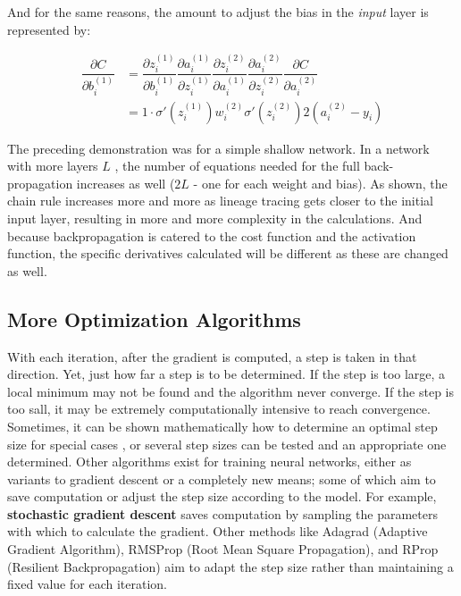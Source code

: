 And for the same reasons, the amount to adjust the bias in the \emph{input} layer is
represented by:

    \begin{align*}
\dfrac{\partial{C}}{\partial{b_i^{(1)}}} 
& = \dfrac{\partial{z_i^{(1)}}}{\partial{b_i^{(1)}}} \dfrac{\partial{a_i^{(1)}}}{\partial{z_i^{(1)}}}  \dfrac{\partial{z_i^{(2)}}}{\partial{a_i^{(1)}}}
     \dfrac{\partial{a_i^{(2)}}}{\partial{z_i^{(2)}}}
     \dfrac{\partial{C}}{\partial{a_i^{(2)}}} \\ \nonumber
& = 1 \cdot \sigma'(z_i^{(1)}) w_i^{(2)} \sigma'(z_i^{(2)}) 2(a_i^{(2)}-y_i) \nonumber
    \end{align*}


The preceding demonstration was for a simple shallow network.  In a network with more layers $L$ , the number of equations needed for the full back-propagation increases as well ($2L$ - one for each weight and bias).  As shown, the chain rule increases more and more as lineage tracing gets closer to the initial input layer, resulting in more and more complexity in the calculations.  And because backpropagation is catered to the cost function and the activation function, the specific derivatives calculated will be different as these are changed as well.


\subsection{More Optimization Algorithms}

With each iteration, after the gradient is computed, a step is taken in that direction.  Yet, just how far a step is to be determined.  If the step is too large, a local minimum may not be found and the algorithm never converge.  If the step is too sall, it may be extremely computationally intensive to reach convergence.  Sometimes, it can be shown mathematically how to determine an optimal step size for special cases \cite{nar2018step}, or several step sizes can be tested \cite{Goodfellow-et-al-2016} and an appropriate one determined.  Other algorithms exist for training neural networks, either as variants to gradient descent or a completely new means; some of which aim to save computation or adjust the step size according to the model.  For example, \textbf{stochastic gradient descent} saves computation by sampling the parameters with which to calculate the gradient.  Other methods like Adagrad (Adaptive Gradient Algorithm), RMSProp (Root Mean Square Propagation), and RProp (Resilient Backpropagation)\cite{rproprprop} aim to adapt the step size rather than maintaining a fixed value for each iteration.